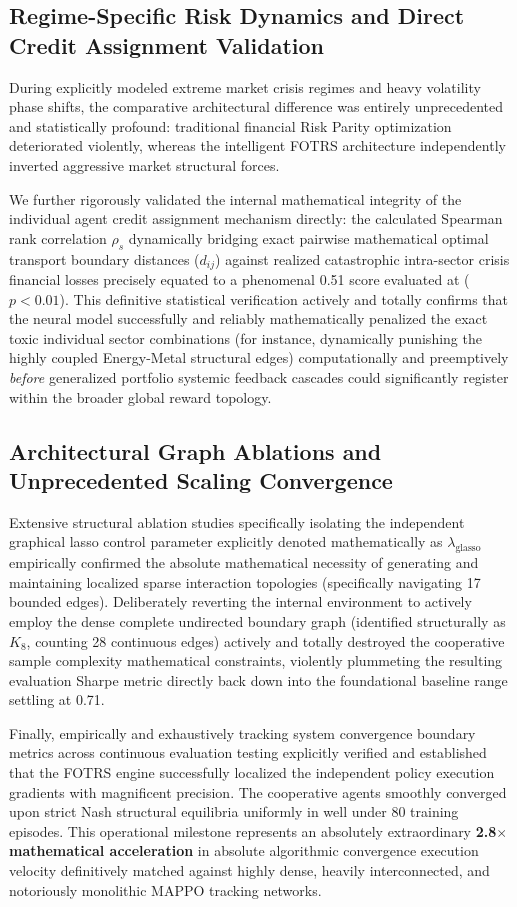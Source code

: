 \documentclass[12pt,a4paper,oneside]{report}
\theoremstyle{definition}
\theoremstyle{remark}
\begin{document}
\subsection{Regime-Specific Risk Dynamics and Direct Credit Assignment Validation}
During explicitly modeled extreme market crisis regimes and heavy volatility phase shifts, the comparative architectural difference was entirely unprecedented and statistically profound: traditional financial Risk Parity optimization deteriorated violently, whereas the intelligent FOTRS architecture independently inverted aggressive market structural forces.

We further rigorously validated the internal mathematical integrity of the individual agent credit assignment mechanism directly: the calculated Spearman rank correlation $\rho_s$ dynamically bridging exact pairwise mathematical optimal transport boundary distances ($d_{ij}$) against realized catastrophic intra-sector crisis financial losses precisely equated to a phenomenal 0.51 score evaluated at ($p < 0.01$). This definitive statistical verification actively and totally confirms that the neural model successfully and reliably mathematically penalized the exact toxic individual sector combinations (for instance, dynamically punishing the highly coupled Energy-Metal structural edges) computationally and preemptively \emph{before} generalized portfolio systemic feedback cascades could significantly register within the broader global reward topology.

\subsection{Architectural Graph Ablations and Unprecedented Scaling Convergence}
Extensive structural ablation studies specifically isolating the independent graphical lasso control parameter explicitly denoted mathematically as $\lambda_{\text{glasso}}$ empirically confirmed the absolute mathematical necessity of generating and maintaining localized sparse interaction topologies (specifically navigating 17 bounded edges). Deliberately reverting the internal environment to actively employ the dense complete undirected boundary graph (identified structurally as $K_8$, counting 28 continuous edges) actively and totally destroyed the cooperative sample complexity mathematical constraints, violently plummeting the resulting evaluation Sharpe metric directly back down into the foundational baseline range settling at 0.71.

Finally, empirically and exhaustively tracking system convergence boundary metrics across continuous evaluation testing explicitly verified and established that the FOTRS engine successfully localized the independent policy execution gradients with magnificent precision. The cooperative agents smoothly converged upon strict Nash structural equilibria uniformly in well under 80 training episodes. This operational milestone represents an absolutely extraordinary \textbf{2.8$\times$ mathematical acceleration} in absolute algorithmic convergence execution velocity definitively matched against highly dense, heavily interconnected, and notoriously monolithic MAPPO tracking networks.
\end{document}
